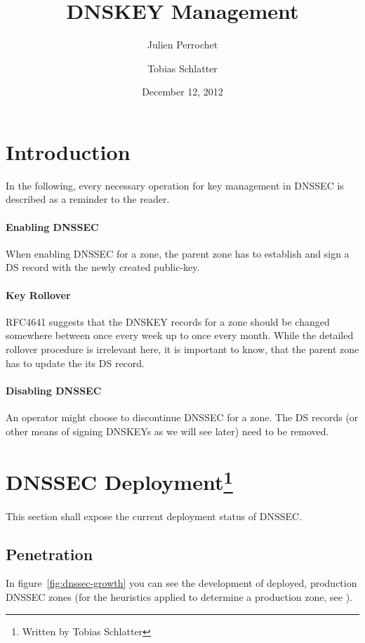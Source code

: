 \documentclass[a4paper]{scrartcl}
\title{DNSKEY Management}
\author{Julien Perrochet \and Tobias Schlatter}
\date{December 12, 2012}
\newcommand{\wbts}{\protect\footnote{Written by Tobias Schlatter}}
\begin{document}
\maketitle

\section{Introduction}

In the following, every necessary operation for key management in
DNSSEC is described as a reminder to the reader.

\paragraph{Enabling DNSSEC} When enabling DNSSEC for a zone, the
parent zone has to establish and sign a DS record with the newly
created public-key.

\paragraph{Key Rollover} RFC4641 \cite{RFC4641} suggests that the DNSKEY
records for a zone should be changed somewhere between once every week
up to once every month. While the detailed rollover procedure is
irrelevant here, it is important to know, that the parent zone has to
update the its DS record.

\paragraph{Disabling DNSSEC} An operator might choose to discontinue
DNSSEC for a zone. The DS records (or other means of signing DNSKEYs
as we will see later) need to be removed.

\section{DNSSEC Deployment\wbts}

This section shall expose the current deployment status of DNSSEC.

\subsection{Penetration}

In figure~\ref{fig:dnssec-growth} you can see the development of
deployed, production DNSSEC zones (for the heuristics applied to
determine a production zone, see \cite{secspider, Osterweil09}).
\end{document}
